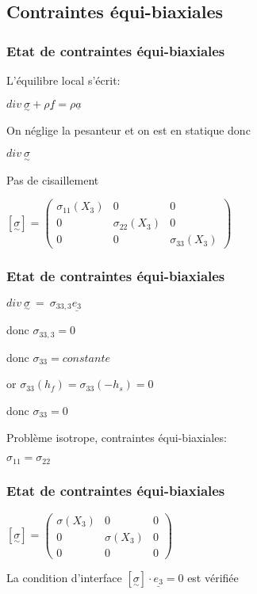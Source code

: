 \subsection{Contraintes équi-biaxiales} 
\begin{frame}
    \frametitle{Etat de contraintes équi-biaxiales}
        \item L'équilibre local s'écrit:
        \item $div ~\underset{\sim}{\sigma} +\rho \underline{f} = \rho \underline{a}$
        \item On néglige la pesanteur et on est en statique donc
        \item $div~\underset{\sim}{\sigma}$
        \item Pas de cisaillement
        \item   $[\underset{\sim}{\sigma}]=\begin{pmatrix}\sigma_{11}(X_3)&0&0\\0&\sigma_{22}(X_3)&0\\0&0&\sigma_{33}(X_3)\end{pmatrix}$ 
        
\end{frame}   

\begin{frame}
    \frametitle{Etat de contraintes équi-biaxiales}
        \item $div~\underset{\sim}{\sigma}~=~\sigma_{33,3}\underline{e_3}$
        \item donc $\sigma_{33,3}=0$
        \item donc $\sigma_{33}=constante$
        \item or $\sigma_{33}(h_f) = \sigma_{33}(-h_s) = 0$
        \item donc $\sigma_{33}=0$
        \item Problème isotrope, contraintes équi-biaxiales:
        \item $\sigma_{11}=\sigma_{22} $
\end{frame}   
\begin{frame}
    \frametitle{Etat de contraintes équi-biaxiales}
        \item $[\underset{\sim}{\sigma}]=\begin{pmatrix}\sigma(X_3)&0&0\\0&\sigma(X_3)&0\\0&0&0\end{pmatrix}$ 
        \item La condition d'interface $[\underset{\sim}{\sigma}]\cdot\underline{e_3} = 0 $ est vérifiée
\end{frame}   

